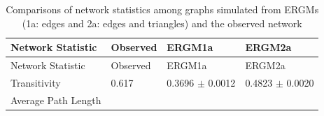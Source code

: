 \documentclass[12pt,twoside]{amherstthesis}
\begin{document}
  \begin{longtable}[]{@{}llll@{}}
  \caption{Comparisons of network statistics among graphs simulated from
  ERGMs (1a: edges and 2a: edges and triangles) and the observed network
  \label{tab:ergm1a2a}}\tabularnewline
  \toprule
  \begin{minipage}[b]{0.28\columnwidth}\raggedright\strut
  Network Statistic\strut
  \end{minipage} & \begin{minipage}[b]{0.11\columnwidth}\raggedright\strut
  Observed\strut
  \end{minipage} & \begin{minipage}[b]{0.24\columnwidth}\raggedright\strut
  ERGM1a\strut
  \end{minipage} & \begin{minipage}[b]{0.26\columnwidth}\raggedright\strut
  ERGM2a\strut
  \end{minipage}\tabularnewline
  \midrule
  \endfirsthead
  \toprule
  \begin{minipage}[b]{0.28\columnwidth}\raggedright\strut
  Network Statistic\strut
  \end{minipage} & \begin{minipage}[b]{0.11\columnwidth}\raggedright\strut
  Observed\strut
  \end{minipage} & \begin{minipage}[b]{0.24\columnwidth}\raggedright\strut
  ERGM1a\strut
  \end{minipage} & \begin{minipage}[b]{0.26\columnwidth}\raggedright\strut
  ERGM2a\strut
  \end{minipage}\tabularnewline
  \midrule
  \endhead
  \begin{minipage}[t]{0.28\columnwidth}\raggedright\strut
  Transitivity\strut
  \end{minipage} & \begin{minipage}[t]{0.11\columnwidth}\raggedright\strut
  0.617\strut
  \end{minipage} & \begin{minipage}[t]{0.24\columnwidth}\raggedright\strut
  0.3696 \(\pm\) 0.0012\strut
  \end{minipage} & \begin{minipage}[t]{0.26\columnwidth}\raggedright\strut
  0.4823 \(\pm\) 0.0020\strut
  \end{minipage}\tabularnewline
  \begin{minipage}[t]{0.28\columnwidth}\raggedright\strut
  Average Path Length\strut

\end{minipage}
\end{longtable}
\end{document}
